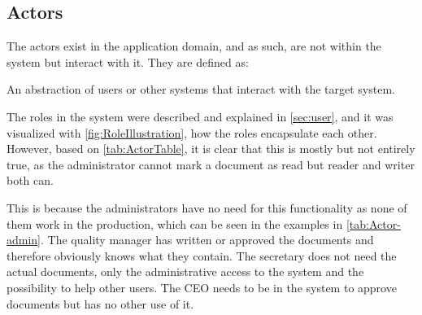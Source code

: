\subsection{Actors}\label{sec:Actors}
The actors exist in the application domain, and as such, are not within the system but interact with it.
They are defined as:

\begin{defn}
An abstraction of users or other systems that interact with the target system. \citep[p.~121]{Rod-Aalborg}
\end{defn}

The roles in the system were described and explained in \cref{sec:user}, and it was visualized with \cref{fig:RoleIllustration}, how the roles encapsulate each other.
However, based on \cref{tab:ActorTable}, it is clear that this is mostly but not entirely true, as the administrator cannot mark a document as read but reader and writer both can.

This is because the administrators have no need for this functionality as none of them work in the production, which can be seen in the examples in \cref{tab:Actor-admin}.
The quality manager has written or approved the documents and therefore obviously knows what they contain.
The secretary does not need the actual documents, only the administrative access to the system and the possibility to help other users.
The CEO needs to be in the system to approve documents but has no other use of it.

